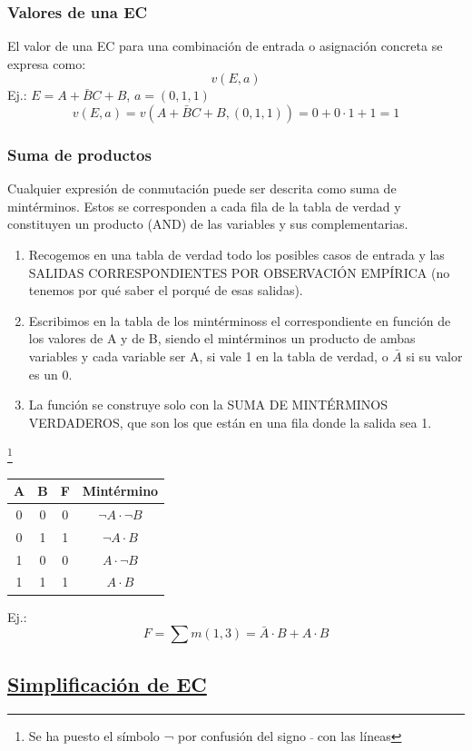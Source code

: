 \documentclass[a4paper,10pt]{book}
\begin{document}
\subsubsection*{Valores de una EC}
El valor de una EC para una combinación de entrada o asignación concreta se expresa como:
$$v(E,a)$$
Ej.: $E=A+\bar{B}C+B$, $a=(0,1,1)$
$$v(E,a)=v(A+\bar{B}C+B, (0,1,1))= 0+0\cdot 1 + 1=1$$

\subsubsection*{Suma de productos}
Cualquier expresión de conmutación puede ser descrita como suma de mintérminos. Estos se corresponden a cada fila de la tabla de verdad y constituyen un producto (AND) de las variables y sus complementarias.
\begin{enumerate}
\item Recogemos en una tabla de verdad todo los posibles casos de entrada y las SALIDAS CORRESPONDIENTES POR OBSERVACIÓN EMPÍRICA (no tenemos por qué saber el porqué de esas salidas).
\item Escribimos en la tabla de los mintérminoss el correspondiente en función de los valores de A y de B, siendo el mintérminos un producto de ambas variables y cada variable ser A, si vale 1 en la tabla de verdad, o $\bar{A}$ si su valor es un 0.
\item La función se construye solo con la SUMA DE MINTÉRMINOS VERDADEROS, que son los que están en una fila donde la salida sea 1.
\end{enumerate}

\begin{center}
\footnote{Se ha puesto el símbolo ¬ por confusión del signo $\bar{}$ con las líneas}
\begin{tabular}{|c|c|c|c|}
\hline
A & B & F & Mintérmino \\
\hline
0 & 0 & 0 & $\neg A\cdot \neg B$ \\
\hline
0 & 1 & 1 & $\neg A \cdot B $ \\
\hline
1 & 0 & 0 & $A\cdot \neg B $ \\
\hline
1 & 1 & 1 & $A\cdot B$ \\
\hline
\end{tabular}
\end{center}
Ej.:
$$F=\sum m(1,3)=\bar{A} \cdot B + A\cdot B$$

\subsection*{\underline {Simplificación de EC}}
\end{document}
